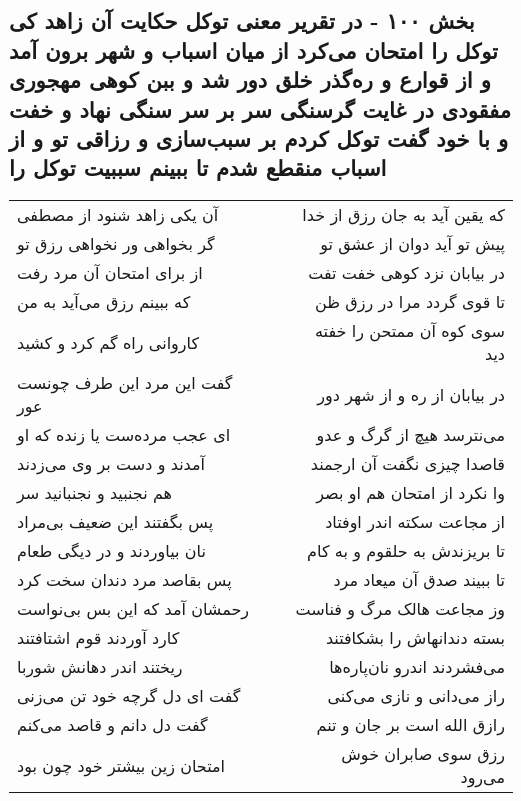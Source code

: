 \begin{center}
\section*{بخش ۱۰۰ - در تقریر معنی توکل حکایت آن زاهد کی توکل را امتحان می‌کرد از میان اسباب و شهر برون آمد و از قوارع و ره‌گذر خلق دور  شد و ببن کوهی مهجوری مفقودی در غایت گرسنگی سر بر سر سنگی  نهاد و خفت و با خود گفت توکل کردم بر سبب‌سازی و رزاقی تو و از اسباب منقطع شدم تا ببینم سببیت توکل را}
\label{sec:sh100}
\begin{longtable}{l p{0.5cm} r}
آن یکی زاهد شنود از مصطفی
&&
که یقین آید به جان رزق از خدا
\\
گر بخواهی ور نخواهی رزق تو
&&
پیش تو آید دوان از عشق تو
\\
از برای امتحان آن مرد رفت
&&
در بیابان نزد کوهی خفت تفت
\\
که ببینم رزق می‌آید به من
&&
تا قوی گردد مرا در رزق ظن
\\
کاروانی راه گم کرد و کشید
&&
سوی کوه آن ممتحن را خفته دید
\\
گفت این مرد این طرف چونست عور
&&
در بیابان از ره و از شهر دور
\\
ای عجب مرده‌ست یا زنده که او
&&
می‌نترسد هیچ از گرگ و عدو
\\
آمدند و دست بر وی می‌زدند
&&
قاصدا چیزی نگفت آن ارجمند
\\
هم نجنبید و نجنبانید سر
&&
وا نکرد از امتحان هم او بصر
\\
پس بگفتند این ضعیف بی‌مراد
&&
از مجاعت سکته اندر اوفتاد
\\
نان بیاوردند و در دیگی طعام
&&
تا بریزندش به حلقوم و به کام
\\
پس بقاصد مرد دندان سخت کرد
&&
تا ببیند صدق آن میعاد مرد
\\
رحمشان آمد که این بس بی‌نواست
&&
وز مجاعت هالک مرگ و فناست
\\
کارد آوردند قوم اشتافتند
&&
بسته دندانهاش را بشکافتند
\\
ریختند اندر دهانش شوربا
&&
می‌فشردند اندرو نان‌پاره‌ها
\\
گفت ای دل گرچه خود تن می‌زنی
&&
راز می‌دانی و نازی می‌کنی
\\
گفت دل دانم و قاصد می‌کنم
&&
رازق الله است بر جان و تنم
\\
امتحان زین بیشتر خود چون بود
&&
رزق سوی صابران خوش می‌رود
\\
\end{longtable}
\end{center}
